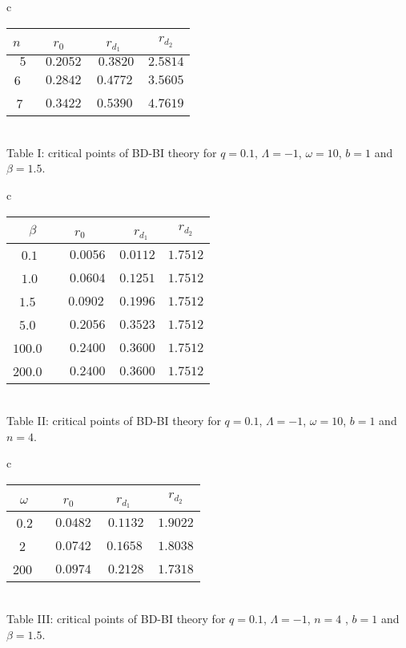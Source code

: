 \documentclass[aps,onecolumn ]{revtex4}
\begin{document}
\begin{center}
\begin{tabular}{c}
\begin{tabular}{cccc}
\hline\hline $n$ \  & $r_{0}$ \  & \ $r_{d_{1}}$ \  & $r_{d_{2}}$
\\ \hline\hline $5$ & $0.2052\ $ & $0.3820$ & $2.5814$ \\ \hline
$6$ \  & $0.2842\ $ & $0.4772\ $ & $3.5605$ \\ \hline $7$\  &
$0.3422\ $ & $0.5390\ $ & $4.7619$ \\ \hline
\end{tabular}
\\
Table I: critical points of BD-BI theory for $q=0.1$, $\Lambda
=-1$, $\omega
=10$, $b=1$ and $\beta =1.5$.%
\end{tabular}

\begin{tabular}{c}
\begin{tabular}{cccc}
\hline\hline $\beta $ & $r_{0}$ \  & \ $r_{d_{1}}$ & $r_{d_{2}}$
\\ \hline\hline
$0.1$\  & $\ 0.0056$ & $0.0112$ & $1.7512$ \\ \hline $1.0$\  & $\
0.0604$ & $0.1251$ & $1.7512$ \\ \hline $1.5$ \  &$\ 0.0902\ $ &
$0.1996$ & $1.7512$ \\ \hline $5.0$ \  & $\ 0.2056$ & $0.3523 $ &
$1.7512$ \\ \hline $100.0$ \  & $\ 0.2400$ & $0.3600 $ & $1.7512$
\\ \hline $200.0$ \  & $\ 0.2400$ & $0.3600 $ & $1.7512$ \\
\hline
\end{tabular}
\\
Table II: critical points of BD-BI theory for $q=0.1$, $\Lambda =-1$, $%
\omega =10$, $b=1$ and $n=4$.%
\end{tabular}

\begin{tabular}{c}
\begin{tabular}{cccc}
\hline\hline $\omega $\  & $r_{0}$ \  & \ $r_{d_{1}}$ \  &
$r_{d_{2}}$ \\ \hline\hline $0.2$\  & $0.0482\ $ & $0.1132$ &
$1.9022$ \\ \hline $2$ \  & $0.0742\ $ & $0.1658\ $ & $1.8038$ \\
\hline $200$ \  & $0.0974\ $ & $0.2128$ & $1.7318$ \\ \hline
\end{tabular}
\\
Table III: critical points of BD-BI theory for $q=0.1$, $\Lambda =-1$, $n=4$%
, $b=1$ and $\beta =1.5$.%
\end{tabular}
\end{center}
\end{document}
